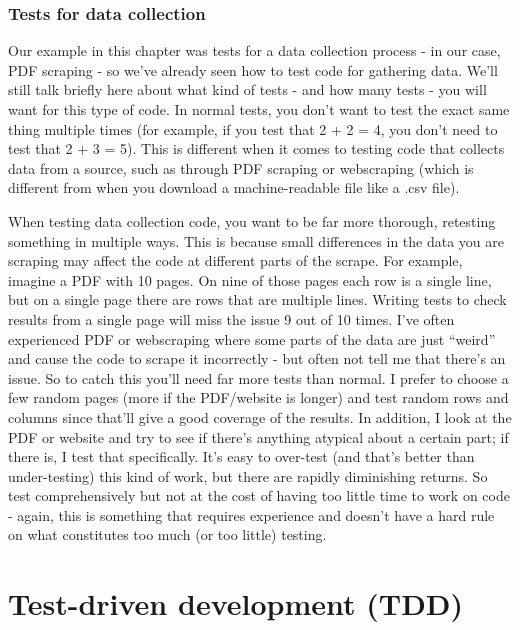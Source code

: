 \documentclass[
]{krantz}
\begin{document}
\hypertarget{tests-for-data-collection}{%
\subsubsection{Tests for data collection}\label{tests-for-data-collection}}

Our example in this chapter was tests for a data collection process - in our case, PDF scraping - so we've already seen how to test code for gathering data. We'll still talk briefly here about what kind of tests - and how many tests - you will want for this type of code. In normal tests, you don't want to test the exact same thing multiple times (for example, if you test that 2 + 2 = 4, you don't need to test that 2 + 3 = 5). This is different when it comes to testing code that collects data from a source, such as through PDF scraping or webscraping (which is different from when you download a machine-readable file like a .csv file).

When testing data collection code, you want to be far more thorough, retesting something in multiple ways. This is because small differences in the data you are scraping may affect the code at different parts of the scrape. For example, imagine a PDF with 10 pages. On nine of those pages each row is a single line, but on a single page there are rows that are multiple lines. Writing tests to check results from a single page will miss the issue 9 out of 10 times. I've often experienced PDF or webscraping where some parts of the data are just ``weird'' and cause the code to scrape it incorrectly - but often not tell me that there's an issue. So to catch this you'll need far more tests than normal. I prefer to choose a few random pages (more if the PDF/website is longer) and test random rows and columns since that'll give a good coverage of the results. In addition, I look at the PDF or website and try to see if there's anything atypical about a certain part; if there is, I test that specifically. It's easy to over-test (and that's better than under-testing) this kind of work, but there are rapidly diminishing returns. So test comprehensively but not at the cost of having too little time to work on code - again, this is something that requires experience and doesn't have a hard rule on what constitutes too much (or too little) testing.

\hypertarget{test-driven-development-tdd}{%
\section{Test-driven development (TDD)}\label{test-driven-development-tdd}}
\end{document}
